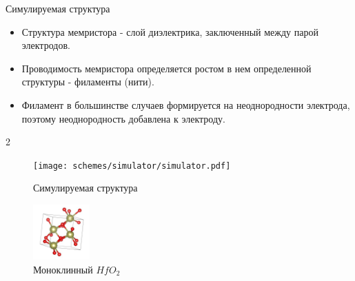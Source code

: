 \documentclass{beamer}%
\begin{document}
\begin{frame} {Симулируемая структура}
    \begin{itemize}
        \item Структура мемристора - слой диэлектрика, заключенный между парой электродов.
        \item Проводимость мемристора определяется ростом в нем определенной структуры - филаменты (нити).
        \item Филамент в большинстве случаев формируется на неоднородности электрода, поэтому неоднородность добавлена к электроду. \footnotemark[3]
    \end{itemize}

    \begin {multicols} {2}
    \begin{figure}
        \centering
        \texttt{[image: schemes/simulator/simulator.pdf]}
        \caption {Симулируемая структура}
    \end{figure}
    
    \columnbreak

    \begin{figure}
        \centering
        \includegraphics[height=80px]{img/POSCAR.jpg}
        \vspace {12px}
        \caption {Моноклинный \(HfO_2\)}
    \end{figure}

\end{multicols}


\end{frame}








\end{document}
